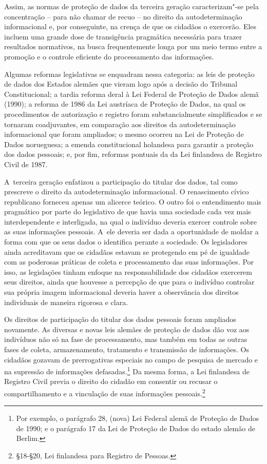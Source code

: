 Assim, as normas de proteção de dados da terceira geração
caracterizam"-se pela concentração -- para não chamar de recuo -- no
direito da autodeterminação informacional e, por conseguinte, na crença
de que os cidadãos o exercerão. Eles incluem uma grande dose de
transigência pragmática necessária para trazer resultados normativos, na
busca frequentemente longa por um meio termo entre a promoção e o
controle eficiente do processamento das informações.

Algumas reformas legislativas se enquadram nessa categoria: as leis de
proteção de dados dos Estados alemães que vieram logo após a decisão do
Tribunal Constitucional; a tardia reforma deral à Lei Federal de
Proteção de Dados alemã (1990); a reforma de 1986 da Lei austríaca de
Proteção de Dados, na qual os procedimentos de autorização e registro
foram substancialmente simplificados e se tornaram coadjuvantes, em
comparação aos direitos da autodeterminação informacional que foram
ampliados; o mesmo ocorreu na Lei de Proteção de Dados norueguesa; a
emenda constitucional holandesa para garantir a proteção dos dados
pessoais; e, por fim, reformas pontuais da da Lei finlandesa de Registro
Civil de 1987.

A~terceira geração enfatizou a participação do titular dos dados, tal
como prescreve o direito da autodeterminação informacional. O
renascimento cívico republicano forneceu apenas um alicerce teórico. O
outro foi o entendimento mais pragmático por parte do legislativo de que
havia uma sociedade cada vez mais interdependente e interligada, na qual
o indivíduo deveria exercer controle sobre as suas informações pessoais.
A~ele deveria ser dada a oportunidade de moldar a forma com que os seus
dados o identifica perante a sociedade. Os legisladores ainda
acreditavam que os cidadãos estavam se protegendo em pé de igualdade com
as poderosas práticas de coleta e processamento das suas informações.
Por isso, as legislações tinham enfoque na responsabilidade dos cidadãos
exercerem seus direitos, ainda que houvesse a percepção de que para o
indivíduo controlar sua própria imagem informacional deveria haver a
observância dos direitos individuais de maneira rigorosa e clara.

Os direitos de participação do titular dos dados pessoais foram
ampliados novamente. As diversas e novas leis alemães de proteção de
dados dão voz aos indivíduos não só na fase de processamento, mas também
em todas as outras fases de coleta, armazenamento, tratamento e
transmissão de informações. Os cidadãos gozavam de prerrogativas
especiais no campo de pesquisa de mercado e na supressão de informações
defasadas.\footnote{Por exemplo, o parágrafo 28, (nova) Lei Federal
  alemã de Proteção de Dados de 1990; e o parágrafo 17 da Lei de
  Proteção de Dados do estado alemão de Berlim.} Da mesma forma, a Lei
finlandesa de Registro Civil previa o direito do cidadão em consentir ou
recusar o compartilhamento e a vinculação de suas informações
pessoais.\footnote{§18-§20, Lei finlandesa para Registro de Pessoas.}

